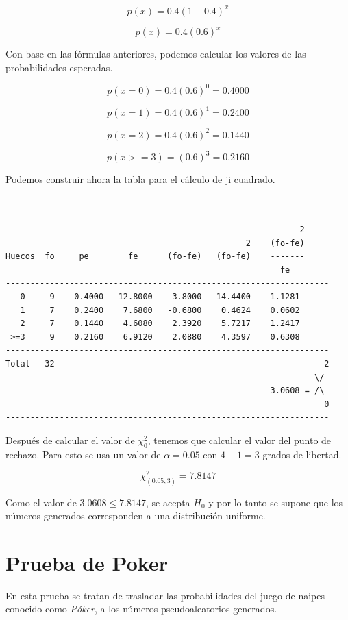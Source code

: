 $$p(x)  =  0.4 (1 - 0.4)^x$$

$$p(x)  =  0.4 (0.6)^x$$


Con base en las fórmulas anteriores, podemos calcular los valores de las probabilidades esperadas.


$$p(x = 0)  =  0.4 (0.6)^0   =  0.4000$$

$$p(x = 1)  =  0.4 (0.6)^1   =  0.2400$$

$$p(x = 2)  =  0.4 (0.6)^2   =  0.1440$$

$$p(x>= 3)  =      (0.6)^3   =  0.2160$$

Podemos construir ahora la tabla para el cálculo de ji cuadrado.
\begin{verbatim}
    
------------------------------------------------------------------
                                                            2
                                                 2    (fo-fe)
Huecos  fo     pe        fe      (fo-fe)   (fo-fe)    -------
                                                        fe
------------------------------------------------------------------
   0     9    0.4000   12.8000   -3.8000   14.4400    1.1281
   1     7    0.2400    7.6800   -0.6800    0.4624    0.0602
   2     7    0.1440    4.6080    2.3920    5.7217    1.2417
 >=3     9    0.2160    6.9120    2.0880    4.3597    0.6308
------------------------------------------------------------------
Total   32                                                       2
                                                               \/
                                                      3.0608 = /\
                                                                 0
------------------------------------------------------------------
\end{verbatim}

Después de calcular el valor de $\chi^2_0$, tenemos que calcular el valor del punto de rechazo. Para esto se usa un valor de $\alpha = 0.05$ con $4-1=3$ grados de libertad.

$$\chi^2_{(0.05,3)} = 7.8147$$

Como el valor de $3.0608 \leq 7.8147$, se acepta $H_0$ y por lo tanto se supone que los números generados corresponden a una distribución uniforme.

\section{Prueba de Poker}
En esta prueba se tratan de trasladar las probabilidades del juego de naipes conocido como \textit{Póker}, a los números pseudoaleatorios generados. 

